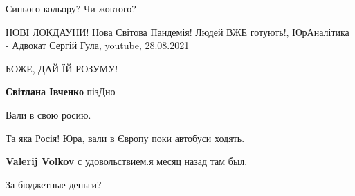 \begin{itemize}
\begin{itemize}
Синього кольору?
Чи жовтого?
\end{itemize}

 
\href{https://youtu.be/nVaRQlgTcpk}{%
НОВІ ЛОКДАУНИ! Нова Світова Пандемія! Людей ВЖЕ готують!, %
ЮрАналітика - Адвокат Сергій Гула, youtube, 28.08.2021%
}

 
БОЖЕ, ДАЙ ЇЙ РОЗУМУ! 🙏🙏🙏

\begin{itemize}
 
\textbf{Світлана Івченко} пізДно
\end{itemize}

 
Вали в свою росию.

\begin{itemize}
 
Та яка Росія!
Юра, вали в Європу поки автобуси ходять.

 
\textbf{Valerij Volkov} с удовольствием.я месяц назад там был.

 
За бюджетные деньги?
\end{itemize}



\end{itemize}

